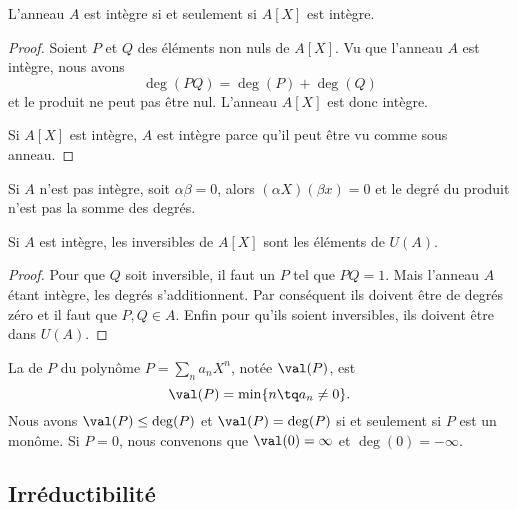 \begin{theorem}
    L'anneau \( A\) est intègre si et seulement si \( A[X]\) est intègre.
\end{theorem}

\begin{proof}
    Soient \( P\) et \( Q\) des éléments non nuls de \( A[X]\). Vu que l'anneau \( A\) est intègre, nous avons
    \begin{equation}
        \deg(PQ)=\deg(P)+\deg(Q)
    \end{equation}
    et le produit ne peut pas être nul. L'anneau \( A[X]\) est donc intègre.

    Si \( A[X]\) est intègre, \( A\) est intègre parce qu'il peut être vu comme sous anneau.
\end{proof}

\begin{remark}
    Si \( A\) n'est pas intègre, soit \( \alpha\beta=0\), alors \( (\alpha X)(\beta x)=0\) et le degré du produit n'est pas la somme des degrés.
\end{remark}

\begin{corollary}
    Si \( A\) est intègre, les inversibles de \( A[X]\) sont les éléments de \( U(A)\).
\end{corollary}

\begin{proof}
    Pour que \( Q\) soit inversible, il faut un \( P\) tel que \( PQ=1\). Mais l'anneau \( A\) étant intègre, les degrés s'additionnent. Par conséquent ils doivent être de degrés zéro et il faut que \( P,Q\in A\). Enfin pour qu'ils soient inversibles, ils doivent être dans \( U(A)\).
\end{proof}

La  de \( P\) du polynôme \( P=\sum_n a_nX^n\), notée \( \val(P)\), est 
\begin{equation}
    \val(P)=\min\{ n\tq a_n\neq 0 \}.
\end{equation}
Nous avons \( \val(P)\leq \deg(P)\) et \( \val(P)=\deg(P)\) si et seulement si \( P\) est un monôme. Si \( P=0\), nous convenons que \( \val(0)=\infty\) et \( \deg(0)=-\infty\).

\subsection{Irréductibilité}

